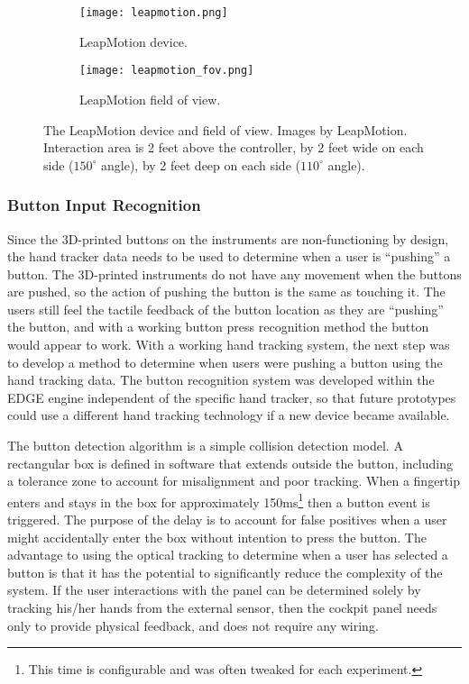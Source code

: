 \begin{figure}
    \centering
    \begin{subfigure}[t]{0.49\linewidth}
        \centering
        \texttt{[image: leapmotion.png]}
        \caption{LeapMotion device.}
        \label{fig:proto_leap_device}
    \end{subfigure}
    \begin{subfigure}[t]{0.49\linewidth}
        \centering
        \texttt{[image: leapmotion\_fov.png]}
        \caption{LeapMotion field of view.}
        \label{fig:proto_leap_fov}
    \end{subfigure}
    \caption{The LeapMotion device and field of view. Images by LeapMotion. Interaction area is 2 feet above the controller, by 2 feet wide on each side ($150^{\circ}$ angle), by 2 feet deep on each side ($110^{\circ}$ angle).}
    \label{fig:proto_leap}
\end{figure}

\subsubsection{Button Input Recognition}
\label{sec:proto_button_input}

Since the 3D-printed buttons on the instruments are non-functioning by design, the hand tracker data needs to be used to determine when a user is ``pushing'' a button.
The 3D-printed instruments do not have any movement when the buttons are pushed, so the action of pushing the button is the same as touching it.
The users still feel the tactile feedback of the button location as they are ``pushing'' the button, and with a working button press recognition method the button would appear to work.
With a working hand tracking system, the next step was to develop a method to determine when users were pushing a button using the hand tracking data.
The button recognition system was developed within the EDGE engine independent of the specific hand tracker, so that future prototypes could use a different hand tracking technology if a new device became available.

The button detection algorithm is a simple collision detection model.
A rectangular box is defined in software that extends outside the button, including a tolerance zone to account for misalignment and poor tracking.
When a fingertip enters and stays in the box for approximately 150ms\footnote{This time is configurable and was often tweaked for each experiment.} then a button event is triggered.
The purpose of the delay is to account for false positives when a user might accidentally enter the box without intention to press the button.
The advantage to using the optical tracking to determine when a user has selected a button is that it has the potential to significantly reduce the complexity of the system.
If the user interactions with the panel can be determined solely by tracking his/her hands from the external sensor, then the cockpit panel needs only to provide physical feedback, and does not require any wiring.

